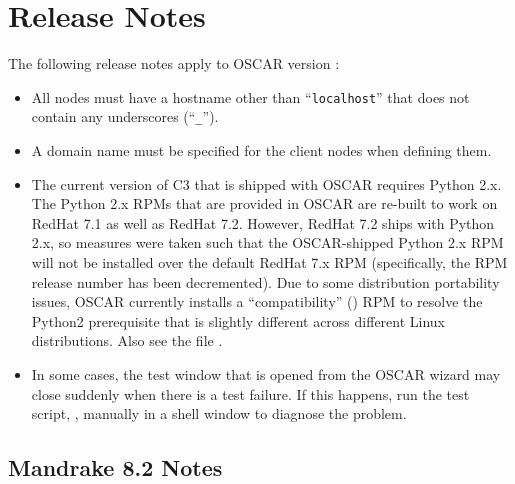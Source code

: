 %
%
%

\section{Release Notes}
\label{sec:release-notes}

The following release notes apply to OSCAR version \oscarversion:

\begchange

\begin{itemize}
\item All nodes must have a hostname other than ``{\tt localhost}''
  that does not contain any underscores (``{\tt \_}'').
  
\item A domain name must be specified for the client nodes when
  defining them.
  
\item The current version of C3 that is shipped with OSCAR requires
  Python 2.x.  The Python 2.x RPMs that are provided in OSCAR are
  re-built to work on RedHat 7.1 as well as RedHat 7.2.  However,
  RedHat 7.2 ships with Python 2.x, so measures were taken such that
  the OSCAR-shipped Python 2.x RPM will not be installed over the
  default RedHat 7.x RPM (specifically, the RPM release number has
  been decremented).  Due to some distribution portability issues,
  OSCAR currently installs a ``compatibility''
  () RPM to resolve the Python2
  prerequisite that is slightly different across different Linux
  distributions.  Also see the file
  .

\item In some cases, the test window that is opened from the 
  OSCAR wizard may close suddenly when there is a test failure. If
  this happens, run the test script, ,
  manually in a shell window to diagnose the problem.
\end{itemize}

\endchange


\subsection{Mandrake 8.2 Notes}
\label{subsec:mdk82notes}

